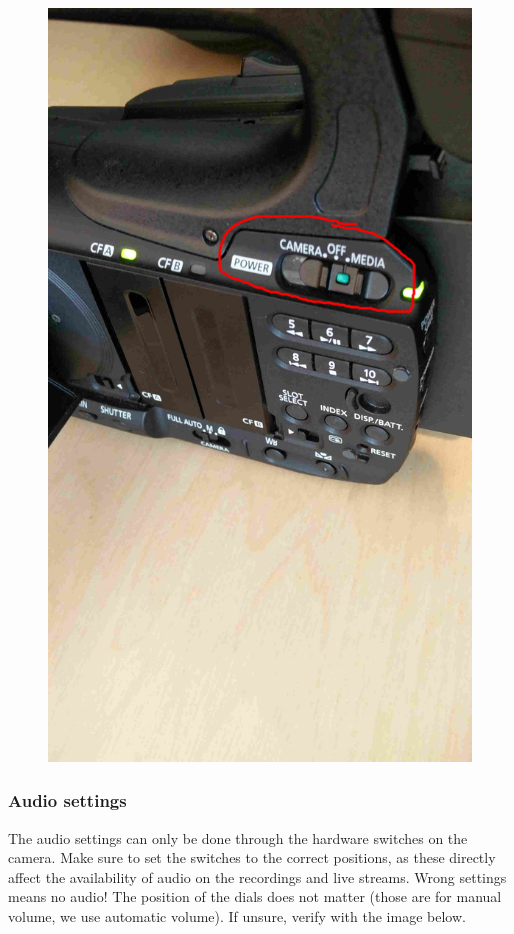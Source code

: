 \documentclass{article}
\begin{document}
\begin{figure}[H]
  \centering
\includegraphics[width = 120mm]{Canon03.jpg}
\end{figure}

\subsubsection{Audio settings}
The audio settings can only be done through the hardware switches on the camera.
Make sure to set the switches to the correct positions, as these directly affect the availability of audio on the recordings and live streams. Wrong settings means no audio!
The position of the dials does not matter (those are for manual volume, we use automatic volume).
If unsure, verify with the image below.
\end{document}
